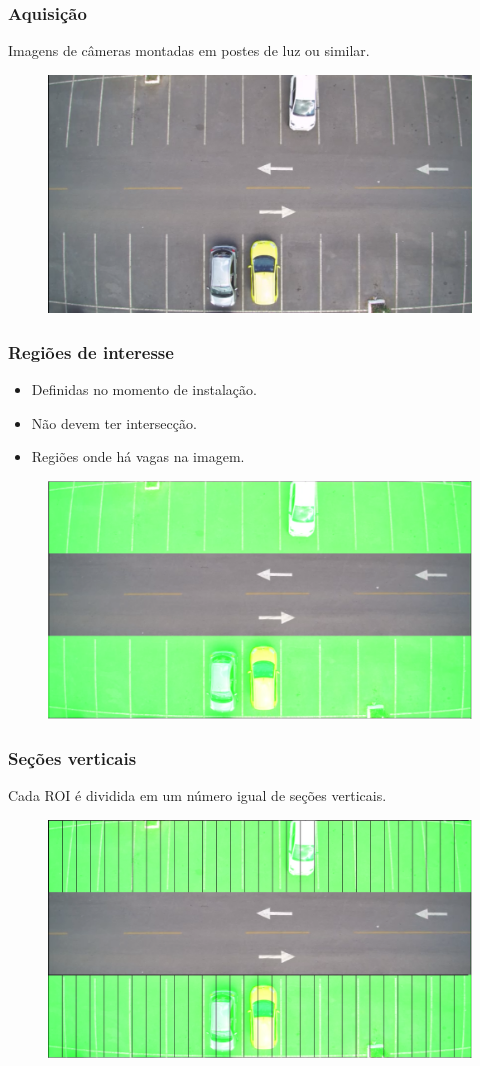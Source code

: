 \documentclass{beamer}
\begin{document}
\begin{frame}
\frametitle{Aquisição}
    \begin{block}{}
    Imagens de câmeras montadas em postes de luz ou similar.
    \end{block}
\begin{figure}
	\centering
	\includegraphics[width=.4\textwidth]{Vazio3}
	\centering
\end{figure}
\end{frame}

\begin{frame}
\frametitle{Regiões de interesse}
\begin{block}{}
\begin{itemize}
\item Definidas no momento de instalação.
\item Não devem ter intersecção.
\item Regiões onde há vagas na imagem.
\end{itemize} 
\end{block}
\begin{figure}
	\centering
	\includegraphics[width=.4\textwidth]{ROIs}
	\centering
\end{figure}
\end{frame}

\begin{frame}
\frametitle{Seções verticais}
\begin{block}{}
Cada ROI é dividida em um número igual de seções verticais.
\end{block}
\begin{figure}
	\centering
	\includegraphics[width=.4\textwidth]{Secoes}
	\centering
\end{figure}

\end{frame}
\end{document}
